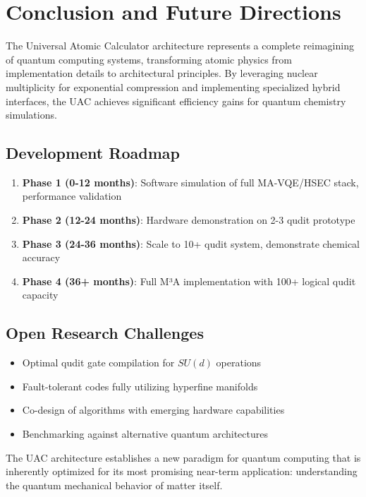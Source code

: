 \documentclass[12pt, a4paper]{article}
\begin{document}
\section{Conclusion and Future Directions}
\label{sec:conclusion}

The Universal Atomic Calculator architecture represents a complete reimagining of quantum computing systems, transforming atomic physics from implementation details to architectural principles. By leveraging nuclear multiplicity for exponential compression and implementing specialized hybrid interfaces, the UAC achieves significant efficiency gains for quantum chemistry simulations.

\subsection{Development Roadmap}
\begin{enumerate}
    \item \textbf{Phase 1 (0-12 months)}: Software simulation of full MA-VQE/HSEC stack, performance validation
    \item \textbf{Phase 2 (12-24 months)}: Hardware demonstration on 2-3 qudit prototype
    \item \textbf{Phase 3 (24-36 months)}: Scale to 10+ qudit system, demonstrate chemical accuracy
    \item \textbf{Phase 4 (36+ months)}: Full M³A implementation with 100+ logical qudit capacity
\end{enumerate}

\subsection{Open Research Challenges}
\begin{itemize}
    \item Optimal qudit gate compilation for $SU(d)$ operations
    \item Fault-tolerant codes fully utilizing hyperfine manifolds
    \item Co-design of algorithms with emerging hardware capabilities
    \item Benchmarking against alternative quantum architectures
\end{itemize}

The UAC architecture establishes a new paradigm for quantum computing that is inherently optimized for its most promising near-term application: understanding the quantum mechanical behavior of matter itself.
\end{document}
